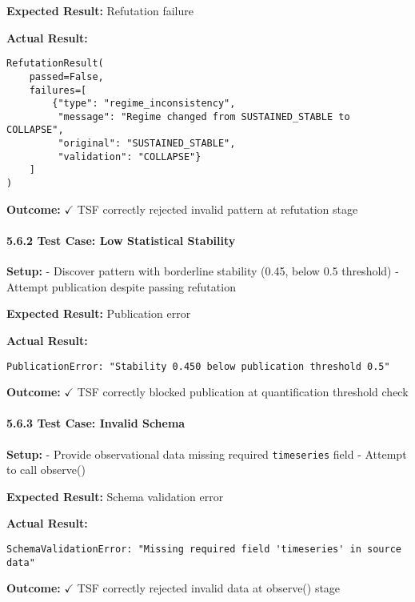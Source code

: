 \documentclass[
]{article}
\begin{document}
\textbf{Expected Result:} Refutation failure

\textbf{Actual Result:}

\begin{verbatim}
RefutationResult(
    passed=False,
    failures=[
        {"type": "regime_inconsistency",
         "message": "Regime changed from SUSTAINED_STABLE to COLLAPSE",
         "original": "SUSTAINED_STABLE",
         "validation": "COLLAPSE"}
    ]
)
\end{verbatim}

\textbf{Outcome:} $\checkmark$ TSF correctly rejected invalid pattern at refutation
stage

\paragraph{5.6.2 Test Case: Low Statistical
Stability}\label{test-case-low-statistical-stability}

\textbf{Setup:} - Discover pattern with borderline stability (0.45,
below 0.5 threshold) - Attempt publication despite passing refutation

\textbf{Expected Result:} Publication error

\textbf{Actual Result:}

\begin{verbatim}
PublicationError: "Stability 0.450 below publication threshold 0.5"
\end{verbatim}

\textbf{Outcome:} $\checkmark$ TSF correctly blocked publication at quantification
threshold check

\paragraph{5.6.3 Test Case: Invalid
Schema}\label{test-case-invalid-schema}

\textbf{Setup:} - Provide observational data missing required
\texttt{timeseries} field - Attempt to call observe()

\textbf{Expected Result:} Schema validation error

\textbf{Actual Result:}

\begin{verbatim}
SchemaValidationError: "Missing required field 'timeseries' in source data"
\end{verbatim}

\textbf{Outcome:} $\checkmark$ TSF correctly rejected invalid data at observe()
stage
\end{document}
